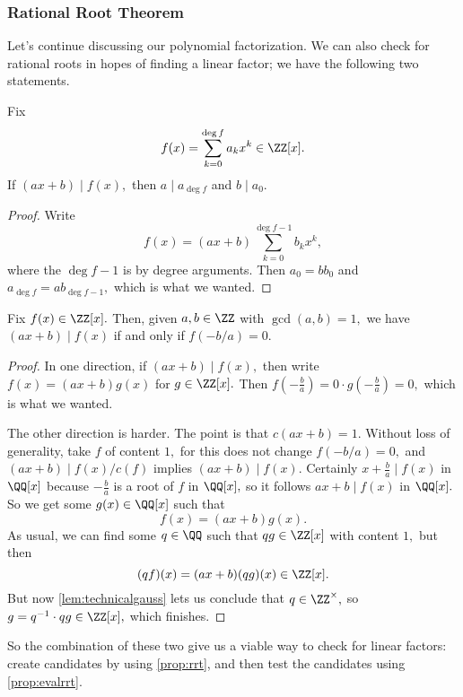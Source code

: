 \subsubsection{Rational Root Theorem}
Let's continue discussing our polynomial factorization. We can also check for rational roots in hopes of finding a linear factor; we have the following two statements.
\begin{proposition} \label{prop:rrt}
	Fix
	\[f(x)=\sum_{k=0}^{\deg f}a_kx^k\in\ZZ[x].\]
	If $(ax+b)\mid f(x),$ then $a\mid a_{\deg f}$ and $b\mid a_0.$
\end{proposition}
\begin{proof}
	Write
	\[f(x)=(ax+b)\sum_{k=0}^{\deg f-1} b_kx^k,\]
	where the $\deg f-1$ is by degree arguments. Then $a_0=bb_0$ and $a_{\deg f}=ab_{\deg f-1},$ which is what we wanted.
\end{proof}
\begin{proposition} \label{prop:evalrrt}
	Fix $f(x)\in\ZZ[x].$ Then, given $a,b\in\ZZ$ with $\gcd(a,b)=1,$ we have $(ax+b)\mid f(x)$ if and only if $f(-b/a)=0.$
\end{proposition}
\begin{proof}
	In one direction, if $(ax+b)\mid f(x),$ then write $f(x)=(ax+b)g(x)$ for $g\in\ZZ[x].$ Then $f\left(-\frac ba\right)=0\cdot g\left(-\frac ba\right)=0,$ which is what we wanted.

	The other direction is harder. The point is that $c(ax+b)=1.$ Without loss of generality, take $f$ of content $1,$ for this does not change $f(-b/a)=0,$ and $(ax+b)\mid f(x)/c(f)$ implies $(ax+b)\mid f(x).$ Certainly $x+\frac ba\mid f(x)$ in $\QQ[x]$ because $-\frac ba$ is a root of $f$ in $\QQ[x],$ so it follows $ax+b\mid f(x)$ in $\QQ[x].$ So we get some $g(x)\in\QQ[x]$ such that
	\[f(x)=(ax+b)g(x).\]
	As usual, we can find some $q\in\QQ$ such that $qg\in\ZZ[x]$ with content $1,$ but then
	\[(qf)(x)=(ax+b)(qg)(x)\in\ZZ[x].\]
	But now \autoref{lem:technicalgauss} lets us conclude that $q\in\ZZ^\times,$ so $g=q^{-1}\cdot qg\in\ZZ[x],$ which finishes. 
\end{proof}
So the combination of these two give us a viable way to check for linear factors: create candidates by using \autoref{prop:rrt}, and then test the candidates using \autoref{prop:evalrrt}.

